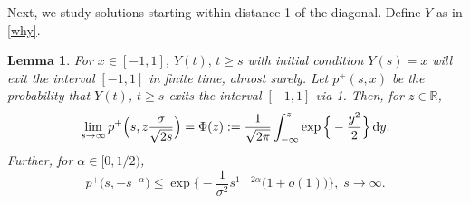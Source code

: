 \documentclass[sn-mathphys-num]{sn-jnl}
\newtheorem{lem}[thm]{Lemma}
\theoremstyle{definition}
\newcommand{\scr}[1]{\mathscr #1}
\numberwithin{equation}{section} \theoremstyle{remark}
\renewcommand{\d}{\hbox{d}}
\def\R{\mathbb R}
\def\d{\text{\rm{d}}} \def\bb{\beta} \def\aa{\alpha} \def\D{\scr D}
\newcommand{\1}{\mathbbm{1}}
\renewcommand{\bar}{\overline}
\begin{document}
  Next, we study solutions starting within distance 1 of the diagonal. Define $Y$ as in \eqref{why}.%

\begin{lem}\label{lem2}
  For $x \in [-1,1]$, $Y(t),\,t \geq s$ with initial condition $Y(s)=x$ will exit the interval $[-1,1]$ in finite time, almost surely.   Let $p^+(s,x)$ be the probability that $Y(t)$, $t \geq s$ exits the interval $[-1,1]$ via 1. Then, for $z \in \R$,
  \begin{equation}\label{limm}
\lim_{s \to \infty}p^+\Big(s,z\frac {\sigma}{\sqrt{2s}}\Big)= \Phi(z):=\frac 1{\sqrt{2\pi}}\int_{-\infty}^z\exp\Big\{-\frac{y^2}2 \Big\}\,\d y.
\end{equation}
Further, for $\alpha \in [0,1/2)$,
$$
p^+\big(s,-s^{-\alpha}\big) \leq \exp\Big\{-\frac 1{\sigma^2}s^{1-2\alpha}\big(1+o(1)\big)    \Big\},\;s \to \infty.
$$
\end{lem}
\end{document}
